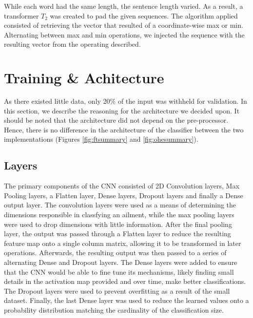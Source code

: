 \documentclass[12pt]{report}
\begin{document}
While each word had the same length, the sentence length varied. As a result,
a transformer $T_2$ was created to pad the given sequences. The algorithm
applied consisted of retrieving the vector that resulted of a coordinate-wise
max or min. Alternating between max and min operations, we injected the sequence
with the resulting vector from the operating described\cite{2016}.

\section{Training \& Achitecture}
As there existed little data, only 20\% of the input was withheld for validation.
In this section, we describe the reasoning for the architecture we decided upon.
It should be noted that the architecture did not depend on the pre-processor.
Hence, there is no difference in the architecture of the classifier between the two implementations 
(Figures \ref{fig:ftsummary} and \ref{fig:ohesummary}).

\subsection{Layers}
The primary components of the CNN consisted of 2D Convolution layers,
Max Pooling layers, a Flatten layer, Dense layers, Dropout layers and finally a Dense output layer.
The convolution layers were used as a means of determining the dimensions
responsible in classfying an ailment, while the max pooling layers were used to drop
dimensions with little information. After the final pooling layer, the output was passed through a
Flatten layer to reduce the resulting feature map onto a single column matrix, allowing it to be
transformed in later operations.
Afterwards, the resulting output was then passed to a series of alternating
Dense and Dropout layers. The Dense layers were added to ensure
that the CNN would be able to fine tune its mechanisms, likely finding small details in the activation map provided
and over time, make better classifications. The Dropout layers were used to prevent overfitting
as a result of the small dataset. Finally, the last Dense layer was used to reduce
the learned values onto a probability distribution matching the cardinality of the classification size\cite{chollet2015keras}.
\end{document}
